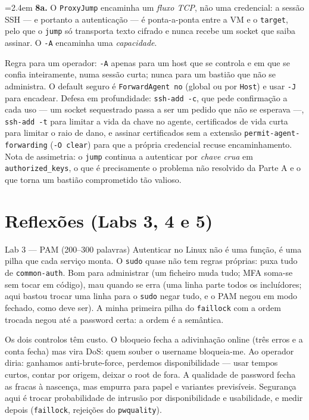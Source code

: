 \documentclass[a4paper,11pt]{article}
\newenvironment{answer}[1]{%
  \par\addvspace{7pt}\noindent
  \hangindent=2.4em\hangafter=1
  {\color{sscnblue}\bfseries #1\hspace{0.55em}}\ignorespaces}
  {\par\addvspace{5pt}}
\newcommand{\cmd}[1]{\textcolor{sscnblue}{\texttt{#1}}}
\begin{document}
\begin{answer}{8a.}
O \cmd{ProxyJump} encaminha um \emph{fluxo TCP}, n\~ao uma credencial: a sess\~ao SSH ---
e portanto a autentica\c{c}\~ao --- \'e ponta-a-ponta entre a VM e o \cmd{target}, pelo que
o \cmd{jump} s\'o transporta texto cifrado e nunca recebe um socket que saiba assinar. O
\cmd{-A} encaminha uma \emph{capacidade}.

Regra para um operador: \cmd{-A} apenas para um host que se controla e em que se confia
inteiramente, numa sess\~ao curta; nunca para um basti\~ao que n\~ao se administra. O
default seguro \'e \cmd{ForwardAgent no} (global ou por \cmd{Host}) e usar \cmd{-J} para
encadear. Defesa em profundidade: \cmd{ssh-add -c}, que pede confirma\c{c}\~ao a cada uso
--- um socket sequestrado passa a ser um pedido que n\~ao se esperava ---,
\cmd{ssh-add -t} para limitar a vida da chave no agente, certificados de vida curta para
limitar o raio de dano, e assinar certificados sem a extens\~ao
\cmd{permit-agent-forwarding} (\cmd{-O clear}) para que a pr\'opria credencial recuse
encaminhamento. Nota de assimetria: o \cmd{jump} continua a autenticar por \emph{chave
crua} em \cmd{authorized\_keys}, o que \'e precisamente o problema n\~ao resolvido da
Parte A e o que torna um basti\~ao comprometido t\~ao valioso.
\end{answer}

\appendix
\section{Reflex\~oes (Labs 3, 4 e 5)}

\begin{callout}{Lab 3 --- PAM (200--300 palavras)}
Autenticar no Linux n\~ao \'e uma fun\c{c}\~ao, \'e uma pilha que cada servi\c{c}o monta. O
\cmd{sudo} quase n\~ao tem regras pr\'oprias: puxa tudo de \cmd{common-auth}. Bom para
administrar (um ficheiro muda tudo; MFA soma-se sem tocar em c\'odigo), mau quando se
erra (uma linha parte todos os inclu\'idores; aqui bastou trocar uma linha para o
\cmd{sudo} negar tudo, e o PAM negou em modo fechado, como deve ser). A minha primeira
pilha do \cmd{faillock} com a ordem trocada negou at\'e a password certa: a ordem \'e a
sem\^antica.

Os dois controlos t\^em custo. O bloqueio fecha a adivinha\c{c}\~ao online (tr\^es erros e
a conta fecha) mas vira DoS: quem souber o username bloqueia-me. Ao operador diria:
ganhamos anti-brute-force, perdemos disponibilidade --- usar tempos curtos, contar por
origem, deixar o root de fora. A qualidade de password fecha as fracas \`a nascen\c{c}a,
mas empurra para papel e variantes previs\'iveis. Seguran\c{c}a aqui \'e trocar
probabilidade de intrus\~ao por disponibilidade e usabilidade, e medir depois
(\cmd{faillock}, rejei\c{c}\~oes do \cmd{pwquality}).
\end{callout}
\end{document}
